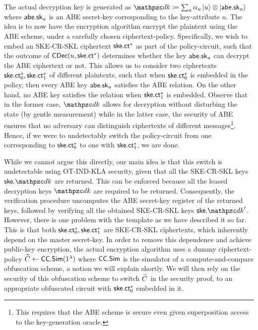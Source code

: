 The actual decryption key is generated as $\qdk \seteq \sum_u
\alpha_u \ket{u} \otimes \ket{\abe.\sk_u}$ where $\mathsf{abe}.\mathsf{sk}_u$ is an ABE secret-key
corresponding to the key-attribute $u$. The idea is to now have the
encryption algorithm encrypt the plaintext using the ABE scheme,
under a carefully chosen ciphertext-policy. Specifically, we wish to
embed an SKE-CR-SKL ciphertext $\mathsf{ske}.\mathsf{ct}^*$ as part of the
policy-circuit, such that the outcome of $\mathsf{CDec}(u, \mathsf{ske}.\mathsf{ct}^*)$
determines whether the key $\mathsf{abe}.\mathsf{sk}_u$ can decrypt the ABE
ciphertext or not. This allows us to consider two ciphertexts
$\mathsf{ske}.\mathsf{ct}_0^*, \mathsf{ske}.\mathsf{ct}_1^*$ of different plaintexts, such that when
$\mathsf{ske}.\mathsf{ct}_0^*$
is embedded in the policy, then every ABE key $\mathsf{abe}.\mathsf{sk}_u$ satisfies
the ABE relation. On the other hand, no ABE key satisfies the relation
when $\mathsf{ske}.\mathsf{ct}_1^*$ is
embedded. Observe that in the former case, $\qdk$ allows for
decryption without disturbing the state (by gentle measurement) while
in the latter case, the security of ABE ensures that no adversary can
distinguish ciphertexts of different messages\footnote{This requires
that the ABE scheme is secure even given superposition access to the
key-generation oracle.}. Hence, if we were to undetectably switch the
policy-circuit from one corresponding to $\mathsf{ske}.\mathsf{ct}_0^*$ to one with
$\mathsf{ske}.\mathsf{ct}_1^*$, we are done.

While we cannot argue this directly, our main idea is that this switch
is undetectable using OT-IND-KLA security, given that all the
SKE-CR-SKL keys $\ske.\qdk$ are returned. This can be enforced because
all the leased decryption keys $\qdk$ are required to be returned.
Consequently, the verification procedure uncomputes the ABE secret-key
register of the returned keys, followed by verifying all the obtained
SKE-CR-SKL keys $\ske.\qdk'$. However, there is one problem with the
template as we have described it so far. This is that both
$\mathsf{ske}.\mathsf{ct}_0^*, \mathsf{ske}.\mathsf{ct}_1^*$ are SKE-CR-SKL ciphertexts, which
inherently depend on the master secret-key. In order to remove this
dependence and achieve public-key encryption, the actual encryption
algorithm uses a dummy ciphertext-policy $\widetilde{C} \leftarrow \mathsf{CC}.\mathsf{Sim}(1^\lambda)$
where $\mathsf{CC}.\mathsf{Sim}$ is the simulator of a compute-and-compare obfuscation
scheme, a notion we will explain shortly.  We will then rely on the
security of this obfuscation scheme to switch $\widetilde{C}$ in the security proof, to
an appropriate obfuscated circuit with $\mathsf{ske}.\mathsf{ct}_0^*$ embedded in
it.

